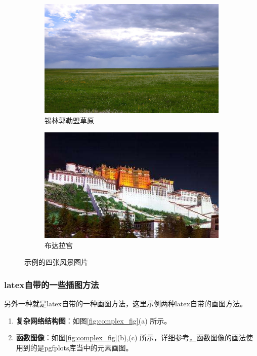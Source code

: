 \begin{figure}[htbp]
    \quad
    \begin{subfigure}[b]{0.4\textwidth}
        \centering
        \includegraphics[width=\textwidth]{figures/xilinguole.jpeg}
        \caption{锡林郭勒盟草原}
        \label{fig:c}
    \end{subfigure}
    \begin{subfigure}[b]{0.4\textwidth}
        \centering
        \includegraphics[width=\textwidth]{figures/budalagong.jpeg}
        \caption{布达拉宫}
        \label{fig:d}
    \end{subfigure}
    \centering
    \caption{示例的四张风景图片}
\end{figure}

\subsubsection{latex自带的一些插图方法}

另外一种就是latex自带的一种画图方法，这里示例两种latex自带的画图方法。
\begin{enumerate}
    \item \textbf{复杂网络结构图}：如图\ref{fig:complex_fig}(a) 所示。
    \item \textbf{函数图像}：如图\ref{fig:complex_fig}(b),(c) 所示，详细参考\href{https://pgfplots.sourceforge.net/gallery.html}，函数图像的画法使用到的是pgfplots库当中的元素画图。
\end{enumerate}

